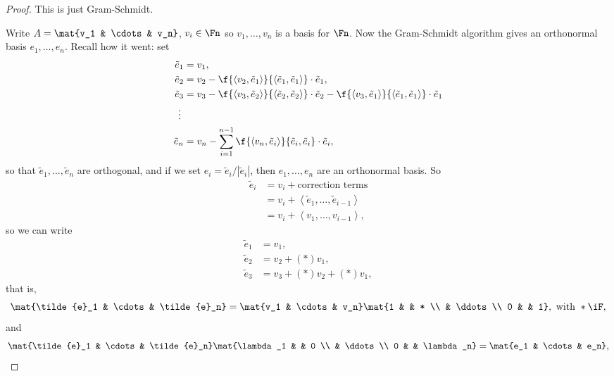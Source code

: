 \begin{proof}
	This is just Gram-Schmidt. %
	
	Write $A=\mat{v_1 & \cdots & v_n}$, $v_i\in\Fn$ so $v_1,\ldots,v_n$ is a basis for $\Fn$. Now the Gram-Schmidt algorithm gives an orthonormal basis $e_1,\ldots,e_n$. Recall how it went: set %
	\begin{align*}
		\tilde{e}_1 &= v_1, \\
		\tilde{e}_2 &= v_2 - \f{\left\langle v_2,\tilde{e}_1 \right\rangle}{\left\langle \tilde{e}_1,\tilde{e}_1 \right\rangle} \cdot \tilde{e}_1, \\ %
		\tilde{e}_3 &= v_3 - \f{\left\langle v_3,\tilde{e}_2 \right\rangle}{\left\langle \tilde{e}_2,\tilde{e}_2 \right\rangle}\cdot \tilde{e}_2 - \f{\left\langle v_3,\tilde{e}_1 \right\rangle}{\left\langle \tilde{e}_1,\tilde{e}_1 \right\rangle} \cdot \tilde{e}_1 \\ %
		\vdots\; & \\
		\tilde{e}_n &= v_n - \sum_{i=1}^{n-1} \f{\left\langle v_n,\tilde{e}_i \right\rangle}{\tilde{e}_i,\tilde{e}_i}\cdot \tilde{e}_i, %
	\end{align*}
	so that $\tilde{e}_1,\ldots,\tilde{e}_n$ are orthogonal, and if we set $e_i=\tilde{e}_i/\left\vert \tilde{e}_i \right\vert$, then $e_1,\ldots,e_n$ are an orthonormal basis. So %
	\begin{align*}
		\tilde{e}_i
		&= v_i + \text{correction terms} \\
		&= v_i + \left\langle \tilde{e}_1,\ldots,\tilde{e}_{i-1} \right\rangle \\
		&= v_i + \left\langle v_1,\ldots,v_{i-1} \right\rangle,
	\end{align*}
	so we can write
	\begin{align*}
		\tilde{e}_1 &= v_1, \\
		\tilde{e}_2 &= v_2 + \left( * \right) v_1, \\
		\tilde{e}_3 &= v_3 + \left( * \right) v_2 + \left( * \right) v_1,
	\end{align*}
	that is,
	\begin{equation*}
		\mat{\tilde{e}_1 & \cdots & \tilde{e}_n} = \mat{v_1 & \cdots & v_n} \mat{1 & & * \\ & \ddots \\ 0 & & 1}, \text{ with } *\iF, %
	\end{equation*}
	and 
	\begin{equation*}
		\mat{\tilde{e}_1 & \cdots & \tilde{e}_n} \mat{\lambda_1 & & 0 \\ & \ddots \\ 0 & & \lambda_n} = \mat{e_1 & \cdots & e_n}, %

\end{equation*}
\end{proof}
